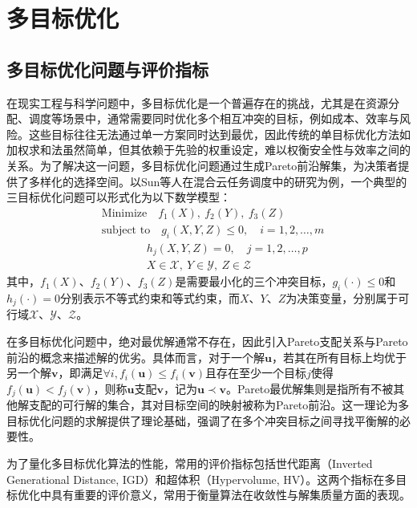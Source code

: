 \section{多目标优化}

\subsection{多目标优化问题与评价指标}
在现实工程与科学问题中，多目标优化是一个普遍存在的挑战，尤其是在资源分配、调度等场景中，通常需要同时优化多个相互冲突的目标，例如成本、效率与风险。这些目标往往无法通过单一方案同时达到最优，因此传统的单目标优化方法如加权求和法虽然简单，但其依赖于先验的权重设定，难以权衡安全性与效率之间的关系。为了解决这一问题，多目标优化问题通过生成Pareto前沿解集，为决策者提供了多样化的选择空间。以Sun等人\cite{sunEfficientEconomicalEnergysaving2023}在混合云任务调度中的研究为例，一个典型的三目标优化问题可以形式化为以下数学模型：
\begin{equation}
    \begin{aligned}
        & \text{Minimize} \quad f_1(X), \ f_2(Y), \ f_3(Z) \\
        & \text{subject to} \quad g_i(X, Y, Z) \leq 0, \quad i = 1, 2, \dots, m \\
        & \quad \quad \quad \quad h_j(X, Y, Z) = 0, \quad j = 1, 2, \dots, p \\
        & \quad \quad \quad \quad X \in \mathcal{X}, \ Y \in \mathcal{Y}, \ Z \in \mathcal{Z}
    \end{aligned}
\end{equation}
其中，\(f_1(X)\)、\(f_2(Y)\)、\(f_3(Z)\)是需要最小化的三个冲突目标，\(g_i(\cdot) \leq 0\)和\(h_j(\cdot) = 0\)分别表示不等式约束和等式约束，而\(X\)、\(Y\)、\(Z\)为决策变量，分别属于可行域\(\mathcal{X}\)、\(\mathcal{Y}\)、\(\mathcal{Z}\)。

在多目标优化问题中，绝对最优解通常不存在，因此引入Pareto支配关系与Pareto前沿的概念来描述解的优劣。具体而言，对于一个解\(\mathbf{u}\)，若其在所有目标上均优于另一个解\(\mathbf{v}\)，即满足\(\forall i, f_i(\mathbf{u}) \leq f_i(\mathbf{v})\)且存在至少一个目标\(j\)使得\(f_j(\mathbf{u}) < f_j(\mathbf{v})\)，则称\(\mathbf{u}\)支配\(\mathbf{v}\)，记为\(\mathbf{u} \prec \mathbf{v}\)。Pareto最优解集则是指所有不被其他解支配的可行解的集合，其对目标空间的映射被称为Pareto前沿。这一理论为多目标优化问题的求解提供了理论基础，强调了在多个冲突目标之间寻找平衡解的必要性。

为了量化多目标优化算法的性能，常用的评价指标包括世代距离（Inverted Generational Distance, IGD）和超体积（Hypervolume, HV）。这两个指标在多目标优化中具有重要的评价意义，常用于衡量算法在收敛性与解集质量方面的表现。


